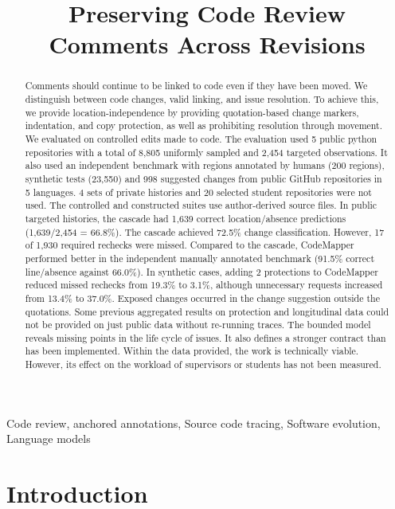 \documentclass[10pt,conference,letterpaper]{IEEEtran}
\title{Preserving Code Review Comments Across Revisions}
\author{\IEEEauthorblockN{Raisa Jose, Noel Alex Samuel, Khadheeja Safar, and Kalyanaraman P}
\IEEEauthorblockA{School of Computer Science and Engineering,\\Vellore Institute of Technology, Vellore, India}}
\begin{document}
\maketitle
\begin{abstract}
Comments should continue to be linked to code even if they have been moved. We distinguish between code changes, valid linking, and issue resolution. To achieve this, we provide location-independence by providing quotation-based change markers, indentation, and copy protection, as well as prohibiting resolution through movement. We evaluated on controlled edits made to code. The evaluation used 5 public python repositories with a total of 8,805 uniformly sampled and 2,454 targeted observations. It also used an independent benchmark with regions annotated by humans (200 regions), synthetic tests (23,550) and 998 suggested changes from public GitHub repositories in 5 languages. 4 sets of private histories and 20 selected student repositories were not used. The controlled and constructed suites use author-derived source files. In public targeted histories, the cascade had 1,639 correct location/absence predictions (1,639/2,454 = 66.8\%). The cascade achieved 72.5\% change classification. However, 17 of 1,930 required rechecks were missed. Compared to the cascade, CodeMapper performed better in the independent manually annotated benchmark (91.5\% correct line/absence against 66.0\%). In synthetic cases, adding 2 protections to CodeMapper reduced missed rechecks from 19.3\% to 3.1\%, although unnecessary requests increased from 13.4\% to 37.0\%. Exposed changes occurred in the change suggestion outside the quotations. Some previous aggregated results on protection and longitudinal data could not be provided on just public data without re-running traces. The bounded model reveals missing points in the life cycle of issues. It also defines a stronger contract than has been implemented. Within the data provided, the work is technically viable. However, its effect on the workload of supervisors or students has not been measured.
\end{abstract}
\begin{IEEEkeywords}
Code review, anchored annotations, Source code tracing, Software evolution, Language models
\end{IEEEkeywords}
\section{Introduction}
\end{document}
